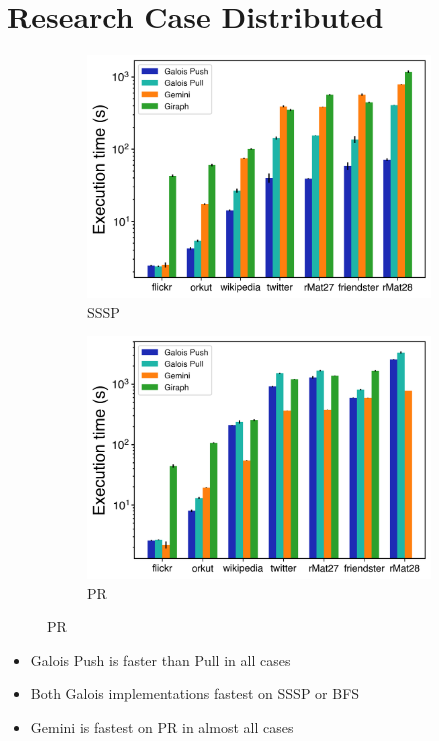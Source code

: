 \documentclass{meetings}
\begin{document}
\section{Research Case Distributed}

\begin{figure}[h]
	\begin{subfigure}{0.45\textwidth}
		\includegraphics[width=\linewidth]{../../plots/distributedSSSP_execTime.png}
		\caption{SSSP}
		\label{fig:distributedSSSP_exec}
	\end{subfigure}
	\hfil
	\begin{subfigure}{0.45\textwidth}
		\includegraphics[width=\linewidth]{../../plots/distributedPR_execTime.png}
		\caption{PR}
		\label{fig:distributedSSSP_exec}
	\end{subfigure}
\end{figure}
\begin{itemize}
	\item Galois Push is faster than Pull in all cases
	\item Both Galois implementations fastest on SSSP or BFS
	\item Gemini is fastest on PR in almost all cases
\end{itemize}
\end{document}
